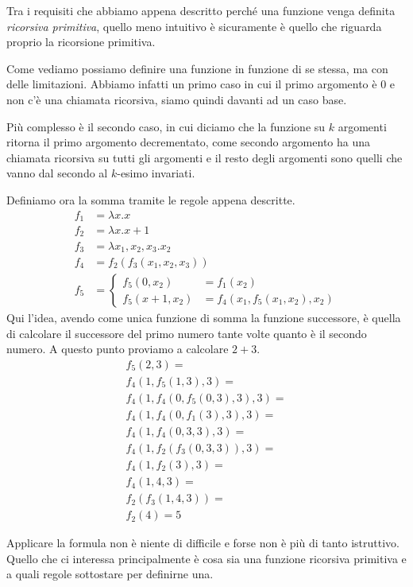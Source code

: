 Tra i requisiti che abbiamo appena descritto perché una
funzione venga definita \emph{ricorsiva primitiva}, quello
meno intuitivo è sicuramente è quello che riguarda proprio
la ricorsione primitiva.

Come vediamo possiamo definire una funzione in funzione di se
stessa, ma con delle limitazioni. Abbiamo infatti un primo caso
in cui il primo argomento è $0$ e non c'è una chiamata
ricorsiva, siamo quindi davanti ad un caso base.

Più complesso è il secondo caso, in cui diciamo che la funzione
su $k$ argomenti ritorna il primo argomento decrementato, come
secondo argomento ha una chiamata ricorsiva su tutti gli
argomenti e il resto degli argomenti sono quelli che vanno dal
secondo al $k$-esimo invariati.

\begin{example}
	Definiamo ora la somma tramite le regole appena descritte.
	\[
		\begin{array}{ll}
			f_1 & = \lambda x.x                    \\
			f_2 & = \lambda x.x + 1                \\
			f_3 & = \lambda x_1, x_2, x_3 . x_2    \\
			f_4 & = f_2 (f_3 (x_1, x_2, x_3))      \\
			f_5 & = \begin{cases}
				        f_5 (0, x_2)     & = f_1 (x_2) \\
				        f_5 (x + 1, x_2) & =
				        f_4 (x_1, f_5(x_1, x_2), x_2)
			        \end{cases}
		\end{array}
	\]
	Qui l'idea, avendo come unica funzione di somma la funzione
	successore, è quella di calcolare il successore del primo
	numero tante volte quanto è il secondo numero. A questo
	punto proviamo a calcolare $2 + 3$.
	\[
		\begin{array}{l}
			f_5(2, 3) =                         \\
			f_4 (1, f_5(1, 3), 3) =             \\
			f_4 (1, f_4(0, f_5 (0, 3), 3), 3) = \\
			f_4 (1, f_4(0, f_1 (3), 3), 3) =    \\
			f_4 (1, f_4(0, 3, 3), 3) =          \\
			f_4 (1, f_2(f_3(0, 3, 3)), 3) =     \\
			f_4 (1, f_2(3), 3) =                \\
			f_4 (1, 4, 3) =                     \\
			f_2 (f_3 (1, 4, 3)) =               \\
			f_2 (4) = 5
		\end{array}
	\]
\end{example}
Applicare la formula non è niente di difficile e forse
non è più di tanto istruttivo. Quello che ci interessa
principalmente è cosa sia una funzione ricorsiva primitiva e a
quali regole sottostare per definirne una.

